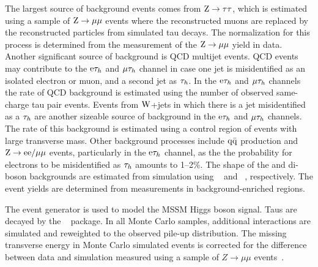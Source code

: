 The largest source of background events comes from $\mathrm{Z}\to\mathrm{\tau}\mathrm{\tau}$, which is estimated using a sample of $\mathrm{Z}\to\mathrm{\mu}\mathrm{\mu}$ events where the reconstructed muons are replaced by the reconstructed particles from simulated tau decays. The normalization for this process is determined from the measurement of the $\mathrm{Z}\to\mathrm{\mu}\mathrm{\mu}$ yield in data. 
Another significant source of background is QCD multijet events.
QCD events may contribute to the $\mathrm{e}\mathrm{\tau}_h$ and $\mathrm{\mu}\mathrm{\tau}_h$ channel
in case one jet is misidentified as an isolated electron or muon, and a second jet as $\mathrm{\tau}_h$.
In the $\mathrm{e}\mathrm{\tau}_h$ and $\mathrm{\mu}\mathrm{\tau}_h$ channels the rate of QCD background is estimated using the number of observed same-charge
tau pair events.
Events from $\mathrm{W}$+jets in which there is a jet misidentified as a $\mathrm{\tau}_h$ are another sizeable source of background in the $\mathrm{e}\mathrm{\tau}_h$ and $\mathrm{\mu}\mathrm{\tau}_h$ channels.
The rate of this background is estimated using a control region of events with large transverse mass.
Other background processes include $\mathrm{q}\mathrm{\bar{q}}$ production
and $\mathrm{Z}\to \mathrm{e}\mathrm{e}/\mathrm{\mu}\mathrm{\mu}$ events, particularly in the $\mathrm{e}\mathrm{\tau}_h$ channel, 
as the the probability for electrons to be misidentified as $\mathrm{\tau}_h$ amounts to 1--2\%.
The shape of the \ttbar  and di-boson backgrounds are estimated from simulation 
using \MADGRAPH~\cite{Alwall:2007st} and \PYTHIA~\cite{Pythia}, respectively. The event yields are determined from measurements in background-enriched regions.

The event generator \PYTHIA is used to model the MSSM Higgs boson signal.
Taus are decayed by the \TAUOLA~\cite{TAUOLA} package.
In all Monte Carlo  samples, additional interactions are simulated and reweighted to the observed pile-up distribution.  
The missing transverse energy in Monte Carlo simulated events is corrected for the difference between data and simulation 
measured using a sample of $Z\rightarrow\mu\mu$ events~\cite{CMS-EWK-WZ}.



